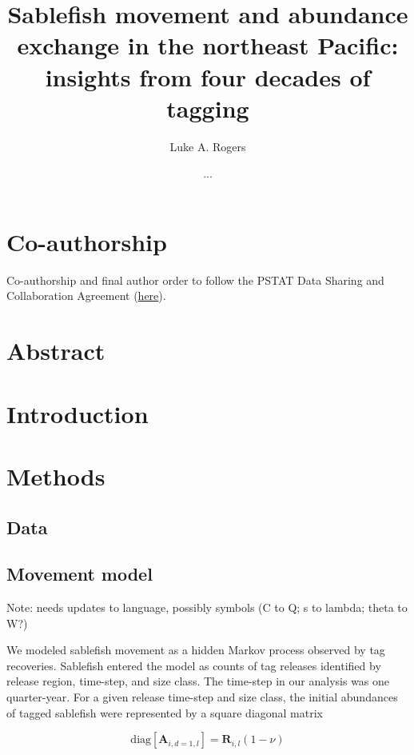 \documentclass{article}
\title{Sablefish movement and abundance exchange in the northeast Pacific: insights from four decades of tagging}
\author[1]{Luke A. Rogers}
\author[]{...}
\affil[1]{Pacific Biological Station, Fisheries and Oceans Canada, Nanaimo, BC, V9T 6N7, Canada}
\begin{document}
\maketitle
\linenumbers
\setcounter{secnumdepth}{0}

\section{Co-authorship}
Co-authorship and final author order to follow the PSTAT Data Sharing and Collaboration Agreement (\href{https://docs.google.com/document/d/1AXIhq6lO_qOPf7q67s_SiDOD6qEfih0COtxQZo7v-Hc/edit?usp=sharing}{here}).

\section{Abstract}

\section{Introduction}

\section{Methods}

\subsection{Data}

\subsection{Movement model}

\noindent Note: needs updates to language, possibly symbols (C to Q; s to lambda; theta to W?) 

We modeled sablefish movement as a hidden Markov process \cite[][]{langrock-2012-flexible-practical} observed by tag recoveries. Sablefish entered the model as counts of tag releases identified by release region, time-step, and size class. The time-step in our analysis was one quarter-year. For a given release time-step and size class, the initial abundances of tagged sablefish were represented by a square diagonal matrix 

\begin{equation}
  \label{eq:abundance-initial}
  \mathrm{diag} \! \left[\boldsymbol{A}_{i,d=1,l}\right] = \boldsymbol{R}_{i,l} \left(1 - \nu \right)
\end{equation}
\end{document}
